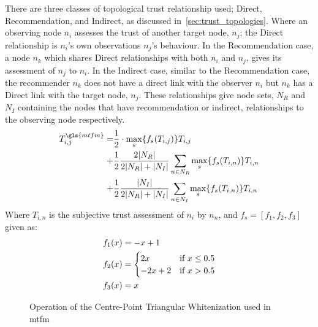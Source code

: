 There are three classes of topological trust relationship used; Direct, Recommendation, and Indirect, as discussed in~\autoref{sec:trust_topologies}.
Where an observing node $n_i$ assesses the trust of another target node, $n_j$; the Direct relationship is $n_i$'s own observations $n_j$'s behaviour.
In the Recommendation case, a node $n_k$ which shares Direct relationships with both $n_i$ and $n_j$, gives its assessment of $n_j$ to $n_i$.
In the Indirect case, similar to the Recommendation case, the recommender $n_k$ does not have a direct link with the observer $n_i$ but $n_k$ has a Direct link with the target node, $n_j$.
These relationships give node sets, $N_R$ and $N_I$ containing the nodes that have recommendation or indirect, relationships to the observing node respectively.
%
\begin{align}
  \label{eq:networkeffects}
  T_{i,j}^{\gls{mtfm}}=&\frac{1}{2} \cdot \max_s\{f_s(T_{i,j})\} T_{i,j}\\ \notag
  +&\frac{1}{2} \frac{2|N_R| }{2|N_R| + |N_I|}\sum_{n \in N_R} \max_s\{f_s(T_{i,n})\} T_{i,n}\\ \notag
  +&\frac{1}{2} \frac{|N_I| }{2|N_R| + |N_I|}\sum_{n \in N_I} \max_s\{f_s(T_{i,n})\} T_{i,n} 
\end{align}
Where $T_{i,n}$ is the subjective trust assessment of $n_i$ by $n_n$, and $f_s = [ f_1,f_2, f_3]$ given as:
\begin{align}
  \label{eq:whitenization}
  f_1(x)&= -x+1\notag\\
  f_2(x)&= 
  \begin{cases}
    2x & \text{if }x\leq 0.5\\
    -2x+2 & \text{if }x>0.5
  \end{cases}\\
  f_3(x)&= x\notag
\end{align}
%

\begin{figure}
	\centering
	\caption{Operation of the Centre-Point Triangular Whitenization used in \gls{mtfm}}
	\label{fig:whitenization}
\end{figure}

